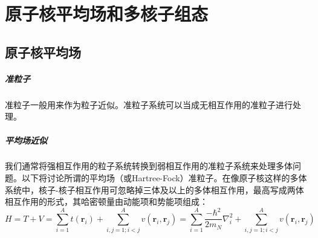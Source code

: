 \chapter{原子核平均场和多核子组态}

\section{原子核平均场}
\paragraph*{准粒子} 准粒子一般用来作为粒子近似。准粒子系统可以当成无相互作用的准粒子进行处理。
\paragraph*{平均场近似} 我们通常将强相互作用的粒子系统转换到弱相互作用的准粒子系统来处理多体问题。以下将讨论所谓的平均场（或Hartree-Fock）准粒子。在像原子核这样的多体系统中，核子-核子相互作用可忽略掉三体及以上的多体相互作用，最高写成两体相互作用的形式，其哈密顿量由动能项和势能项组成：
\begin{equation}
	H = T + V = \sum_{i = 1}^{A} t(\boldsymbol{r}_i) + \sum_{i, j = 1; i < j}^{A} v(\boldsymbol{r}_i, \boldsymbol{r}_j) =  \sum_{i = 1}^{A} \frac{-\hbar^2}{2m_N}\nabla_i^2 + \sum_{i, j = 1; i < j}^{A} v(\boldsymbol{r}_i, \boldsymbol{r}_j) 
\end{equation}
